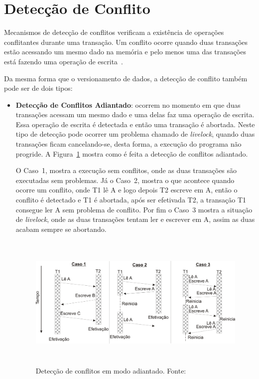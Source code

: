 \documentclass[diss,capa]{texufpel}
\begin{document}
\section{Detecção de Conflito}

Mecanismos de detecção de conflitos verificam a existência de operações conflitantes durante uma transação. Um conflito ocorre quando duas transações estão acessando um mesmo dado na memória e pelo menos uma das transações está fazendo uma operação de escrita~\cite{BaldassinTese2009}.

Da mesma forma que o versionamento de dados, a detecção de conflito também pode ser de dois tipos:

\begin{itemize}
 \item \textbf{Detecção de Conflitos Adiantado}: ocorrem no momento em que duas transações acessam um mesmo dado e uma delas faz uma operação de escrita. Essa operação de escrita é detectada e então uma transação é abortada. Neste tipo de detecção pode ocorrer um problema chamado de \emph{livelock}, quando duas transações ficam cancelando-se, desta forma, a execução do programa não progride. A Figura~\ref{figuradeteccaoadiantado} mostra como é feita a detecção de conflitos adiantado.

 O Caso~1, mostra a execução sem conflitos, onde as duas transações são executadas sem problemas. Já o Caso~2, mostra o que acontece quando ocorre um conflito, onde T1 lê A e logo depois T2 escreve em A, então o conflito é detectado e T1 é abortada, após ser efetivada T2, a transação T1 consegue ler A sem problema de conflito. Por fim o Caso~3 mostra a situação de \emph{livelock}, onde as duas transações tentam ler e escrever em A, assim as duas acabam sempre se abortando.

\begin{figure}[!htp]
\centering
\includegraphics[height=6.5cm]{images/conflitoadiantado.png}
\caption{Detecção de conflitos em modo adiantado. Fonte:~\cite{rigotm}}
\label{figuradeteccaoadiantado}
\end{figure}



\end{itemize}
\end{document}
